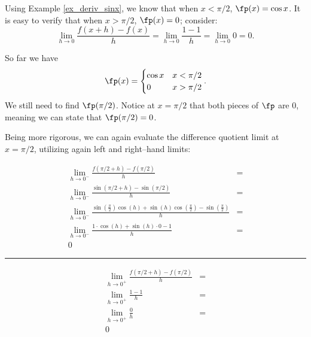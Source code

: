{Using Example \ref{ex_deriv_sinx}, we know that when $x<\pi/2$, $\fp(x) = \cos x$. It is easy to verify that when $x>\pi/2$, $\fp(x) = 0$; consider:
\[
 \lim_{h\to0}\frac{f(x+h) - f(x)}{h}
 = \lim_{h\to0}\frac{1-1}{h} = \lim_{h\to0}0 =0.
\]

So far we have $$\fp(x) = \begin{cases}\cos x & x<\pi/2\\ 0 & x>\pi/2\end{cases}.$$ We still need to find $\fp(\pi/2)$. Notice at $x=\pi/2$ that both pieces of $\fp$ are 0, meaning we can state that $\fp(\pi/2)=0$. 

Being more rigorous, we can again evaluate the difference quotient limit at $x=\pi/2$, utilizing again left and right--hand limits:\\

\small
\noindent\begin{minipage}{.59\linewidth}
\begin{align*}
\lim_{h\to0^-}\frac{f(\pi/2+h)-f(\pi/2)}{h} &=\\
\lim_{h\to0^-}\frac{\sin(\pi/2+h)-\sin(\pi/2)}{h}&=\\
\lim_{h\to0^-}{ \frac{\sin(\frac{\pi}{2})\cos(h)+\sin(h)\cos(\frac{\pi}{2})-\sin(\frac{\pi}{2})}{h}}&=\\
\lim_{h\to0^-}\frac{1\cdot\cos(h)+\sin(h)\cdot 0-1}{h} &=\\
0
\end{align*}
\end{minipage}
\begin{minipage}{1pt}
 \rule{.5pt}{100pt}
\end{minipage}
\begin{minipage}{.39\linewidth}
\begin{align*}
\lim_{h\to0^+}\frac{f(\pi/2+h)-f(\pi/2)}{h} &=\\
\lim_{h\to0^+}\frac{1-1}{h}&=\\
\lim_{h\to0^+}\frac{0}{h}&=\\
0&\\
\phantom{0}\\
\phantom{0}
\end{align*}
\end{minipage}
\normalsize

}
